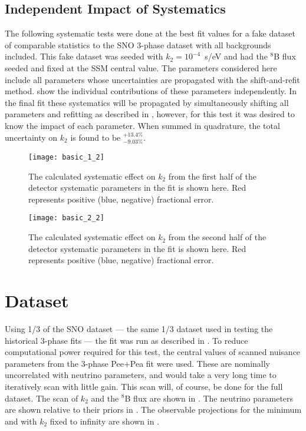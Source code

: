 \clearpage

\subsection{Independent Impact of Systematics}

The following systematic tests were done at the best fit values for a fake dataset of comparable statistics to the SNO 3-phase dataset with all backgrounds included. 
This fake dataset was seeded with $k_2 = 10^{-4}$~s/eV and had the $^8$B flux seeded and fixed at the SSM central value.
The parameters considered here include all parameters whose uncertainties are propagated with the shift-and-refit method. 
 show the individual contributions of these parameters independently.
In the final fit these systematics will be propagated by simultaneously shifting all parameters and refitting as described in , however, for this test it was desired to know the impact of each parameter.
When summed in quadrature, the total uncertainty on $k_2$ is found to be $^{+13.4\%}_{-9.03\%}$.

\begin{figure}
\centering
\texttt{[image: basic\_1\_2]}
\caption{The calculated systematic effect on $k_2$ from the first half of the detector systematic parameters in the fit is shown here. Red represents positive (blue, negative) fractional error.}
\label{fig:detector_systematics1}
\end{figure}

\begin{figure}
\centering
\texttt{[image: basic\_2\_2]}
\caption{The calculated systematic effect on $k_2$ from the second half of the detector systematic parameters in the fit is shown here. Red represents positive (blue, negative) fractional error.}
\label{fig:detector_systematics2}
\end{figure}


\clearpage 

\section{ Dataset}
\label{third}

Using 1/3 of the SNO dataset --- the same 1/3 dataset used in testing the historical 3-phase fits --- the fit was run as described in . 
To reduce computational power required for this test, the central values of scanned nuisance parameters from the 3-phase Pee+Pea fit \cite{3phase} were used. 
These are nominally uncorrelated with neutrino parameters, and would take a very long time to iteratively scan with little gain.
This scan will, of course, be done for the full dataset.
The scan of $k_2$ and the $^8$B flux are shown in .
The neutrino parameters are shown relative to their priors in .
The observable projections for the minimum and with $k_2$ fixed to infinity are shown in .

